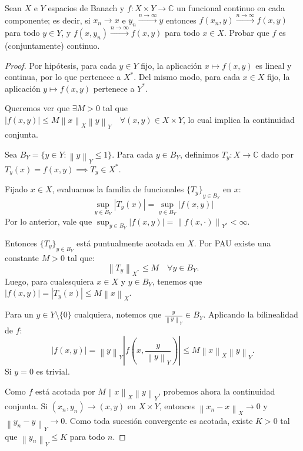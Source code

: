 \documentclass{article}
\theoremstyle{definition}
\newcommand{\C}{\mathbb{C}}
\newcommand{\norm}[1]{\left\lVert #1 \right\rVert}       %
\newenvironment{ejercicio}[1]{\begin{trivlist}
\item[\hskip \labelsep {\bfseries Ejercicio}\hskip \labelsep {\bfseries #1.}]}{\end{trivlist}}
\begin{document}
\begin{ejercicio}{16}
    Sean \(X\) e \(Y\) espacios de Banach y \( f:X\times Y\to\C \) un funcional continuo en cada componente; es decir, si \(x_{n}\to x\) e \(y_{n}\xrightarrow{n\to\infty}y\) entonces \(f(x_{n},y)\xrightarrow{n\to\infty}f(x,y)\) para todo \(y\in Y\), y \(f(x,y_{n})\xrightarrow{n\to\infty}f(x,y)\) para todo \(x\in X\). Probar que \(f\) es (conjuntamente) continuo.
\end{ejercicio}
\begin{proof}
    Por hipótesis, para cada \(y \in Y\) fijo, la aplicación \(x \mapsto f(x,y)\) es lineal y continua, por lo que pertenece a \(X^*\). Del mismo modo, para cada \(x \in X\) fijo, la aplicación \(y \mapsto f(x,y)\) pertenece a \(Y^*\).

    Queremos ver que \(\exists M > 0\) tal que \(|f(x,y)| \leq M \norm{x}_X \norm{y}_Y \quad \forall (x,y) \in X \times Y\), lo cual implica la continuidad conjunta.

    Sea \( B_Y = \{y \in Y : \norm{y}_Y \leq 1\} \). Para cada \(y \in B_Y\), definimos \( T_y : X \to \C \) dado por \(T_y(x) = f(x,y) \implies T_y \in X^*\).

    Fijado \(x \in X\), evaluamos la familia de funcionales \({\{T_y\}}_{y \in B_Y}\) en \(x\):\[
        \sup_{y \in B_Y} |T_y(x)| = \sup_{y \in B_Y} |f(x,y)|
    \]
    Por lo anterior, vale que \(\sup_{y \in B_Y} |f(x,y)| = \norm{f(x,\cdot)}_{Y^*} < \infty \).

    Entonces \({\{T_y\}}_{y \in B_Y}\) está puntualmente acotada en \(X\). Por PAU existe una constante \(M > 0\) tal que:
    \[
        \norm{T_y}_{X^*} \leq M \quad \forall y \in B_Y.
    \]
    Luego, para cualesquiera \(x \in X\) y \(y \in B_Y\), tenemos que \(|f(x,y)| = |T_y(x)| \leq M \norm{x}_X\).

    Para un \( y \in Y\setminus \{0\} \) cualquiera, notemos que \(\frac{y}{\norm{y}_Y} \in B_Y\). Aplicando la bilinealidad de \(f\):
    \[
        |f(x,y)| = \norm{y}_Y \left|f\left(x, \frac{y}{\norm{y}_Y}\right)\right| \leq M \norm{x}_X \norm{y}_Y.
    \]
    Si \( y = 0 \) es trivial.

    Como \(f\) está acotada por \(M \norm{x}_X \norm{y}_Y\), probemos ahora la continuidad conjunta. Si \((x_n, y_n) \to (x, y)\) en \(X \times Y\), entonces \(\norm{x_n - x}_X \to 0\) y \(\norm{y_n - y}_Y \to 0\). Como toda sucesión convergente es acotada, existe \(K > 0\) tal que \(\norm{y_n}_Y \leq K\) para todo \(n\).


\end{proof}
\end{document}
